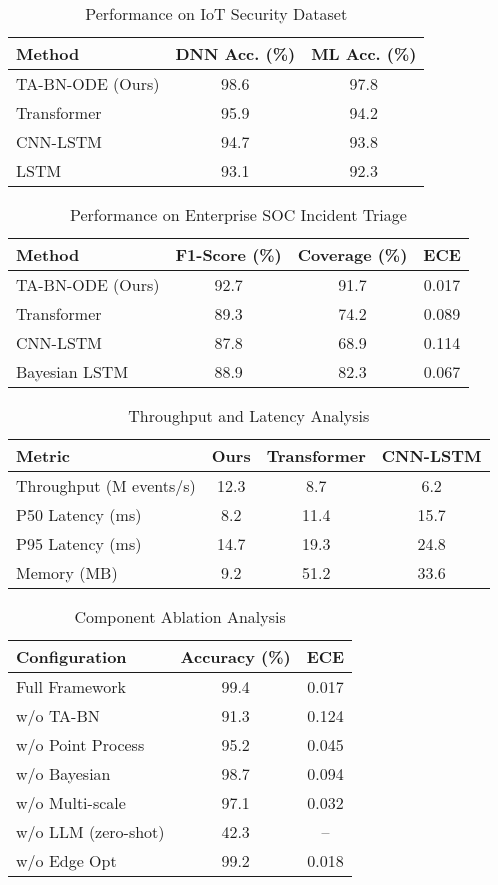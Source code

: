 \documentclass[10pt,journal,compsoc]{IEEEtran}
\begin{document}
\begin{table}[!t]
\centering
\caption{Performance on IoT Security Dataset}
\label{tab:iot_results}
\begin{tabular}{lcc}
\toprule
\textbf{Method} & \textbf{DNN Acc. (\%)} & \textbf{ML Acc. (\%)} \\
\midrule
TA-BN-ODE (Ours) & 98.6 & 97.8 \\
Transformer & 95.9 & 94.2 \\
CNN-LSTM & 94.7 & 93.8 \\
LSTM & 93.1 & 92.3 \\
\bottomrule
\end{tabular}
\end{table}

\begin{table}[!t]
\centering
\caption{Performance on Enterprise SOC Incident Triage}
\label{tab:guide_results}
\begin{tabular}{lccc}
\toprule
\textbf{Method} & \textbf{F1-Score (\%)} & \textbf{Coverage (\%)} & \textbf{ECE} \\
\midrule
TA-BN-ODE (Ours) & 92.7 & 91.7 & 0.017 \\
Transformer & 89.3 & 74.2 & 0.089 \\
CNN-LSTM & 87.8 & 68.9 & 0.114 \\
Bayesian LSTM & 88.9 & 82.3 & 0.067 \\
\bottomrule
\end{tabular}
\end{table}

\begin{table}[!t]
\centering
\caption{Throughput and Latency Analysis}
\label{tab:throughput}
\begin{tabular}{lccc}
\toprule
\textbf{Metric} & \textbf{Ours} & \textbf{Transformer} & \textbf{CNN-LSTM} \\
\midrule
Throughput (M events/s) & 12.3 & 8.7 & 6.2 \\
P50 Latency (ms) & 8.2 & 11.4 & 15.7 \\
P95 Latency (ms) & 14.7 & 19.3 & 24.8 \\
Memory (MB) & 9.2 & 51.2 & 33.6 \\
\bottomrule
\end{tabular}
\end{table}

\begin{table}[!t]
\centering
\caption{Component Ablation Analysis}
\label{tab:ablation}
\begin{tabular}{lcc}
\toprule
\textbf{Configuration} & \textbf{Accuracy (\%)} & \textbf{ECE} \\
\midrule
Full Framework & 99.4 & 0.017 \\
w/o TA-BN & 91.3 & 0.124 \\
w/o Point Process & 95.2 & 0.045 \\
w/o Bayesian & 98.7 & 0.094 \\
w/o Multi-scale & 97.1 & 0.032 \\
w/o LLM (zero-shot) & 42.3 & -- \\
w/o Edge Opt & 99.2 & 0.018 \\
\bottomrule
\end{tabular}
\end{table}
\end{document}
